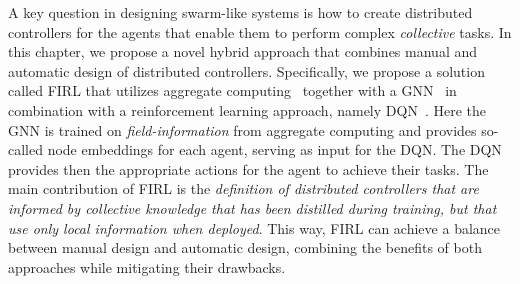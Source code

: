 A key question in designing swarm-like systems is how to create distributed controllers for the agents that enable them to perform complex \emph{collective} tasks. 
%
%
%
%
%
In this chapter, we propose a novel hybrid approach that combines manual and automatic design of distributed controllers.
Specifically, we propose a solution called \ac{FIRL} that utilizes aggregate computing~\cite{Beal2015Computer} together with a \ac{GNN}~\cite{Zhou2020AIOpen} in combination with a reinforcement learning approach, namely \ac{DQN}~\cite{mnih2015human}. 
 Here the \ac{GNN} is trained on \emph{field-information} from aggregate computing and provides so-called node embeddings for each agent, serving as input for the \ac{DQN}. 
 The \ac{DQN} provides then the appropriate actions for the agent to achieve their tasks.
%
The main contribution of \ac{FIRL} is the \emph{definition of distributed controllers that are informed by collective knowledge that has been distilled during training, but that use only local information when deployed}. 
This way, \ac{FIRL} can achieve a balance between manual design and automatic design, combining the benefits of both approaches while mitigating their drawbacks.
